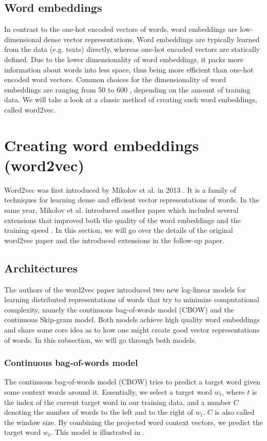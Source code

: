 \subsection{Word embeddings}
In contrast to the one-hot encoded vectors of words, word embeddings are low-dimensional dense vector representations. Word embeddings are typically learned from the data (e.g. texts) directly, whereas one-hot encoded vectors are statically defined. Due to the lower dimensionality of word embeddings, it packs more information about words into less space, thus being more efficient than one-hot encoded word vectors. Common choices for the dimensionality of word embeddings are ranging from 50 to 600 \cite{mikolov2013a}, depending on the amount of training data. We will take a look at a classic method of creating such word embeddings, called word2vec.

\section{Creating word embeddings (word2vec)}
Word2vec was first introduced by Mikolov et al. in 2013 \cite{mikolov2013a}. It is a family of techniques for learning dense and efficient vector representations of words. In the same year, Mikolov et al. introduced another paper which included several extensions that improved both the quality of the word embeddings and the training speed \cite{mikolov2013b}. In this section, we will go over the details of the original word2vec paper and the introduced extensions in the follow-up paper.

\subsection{Architectures}
The authors of the word2vec paper introduced two new log-linear models for learning distributed representations of words that try to minimize computational complexity, namely the continuous bag-of-words model (CBOW) and the continuous Skip-gram model. Both models achieve high quality word embeddings \cite{mikolov2013a} and share some core idea as to how one might create good vector representations of words. In this subsection, we will go through both models.

\subsubsection{Continuous bag-of-words model}
The continuous bag-of-words model (CBOW) tries to predict a target word given some context words around it. Essentially, we select a target word $w_t$, where $t$ is the index of the current target word in our training data, and a number $C$ denoting the number of words to the left and to the right of $w_t$. $C$ is also called the window size. By combining the projected word context vectors, we predict the target word $w_t$. This model is illustrated in .

